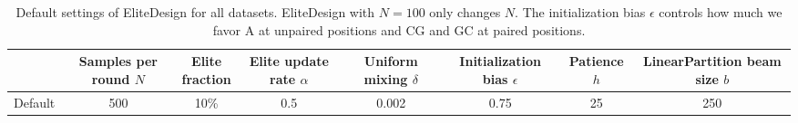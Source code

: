 \begin{table}[H]
\centering\small

\begin{tabular*}{\textwidth}{@{\extracolsep{\fill}}lccccccc@{}}
\toprule
& \shortstack{Samples per\\round $N$} & \shortstack{Elite\\fraction} & \shortstack{Elite update\\rate $\alpha$} & \shortstack{Uniform\\mixing $\delta$} & \shortstack{Initialization\\bias $\epsilon$} & \shortstack{Patience\\$h$} & \shortstack{LinearPartition\\beam size $b$} \\
\midrule
Default & 500 & 10\% & 0.5 & 0.002 & 0.75 & 25 & 250 \\
\bottomrule
\end{tabular*}
\caption{Default settings of EliteDesign for all datasets. EliteDesign with $N=100$ only changes $N$. The initialization bias $\epsilon$ controls how much we favor A at unpaired positions and CG and GC at paired positions.}
\label{tab:defaults}
\end{table}

